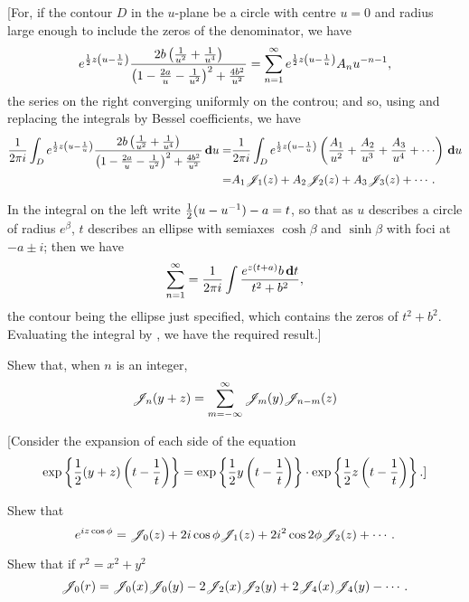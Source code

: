 \documentclass{book}
\begin{document}
[For, if the contour $D$ in the $u$-plane be a circle with centre
$u=0$ and radius large enough to include the zeros of the denominator,
we have
$$
e^{\frac{1}{2} z \left( u - \frac{1}{u} \right)} 
\frac{ 2b \left( \frac{1}{u^2} + \frac{1}{u^4}  \right)  }{ \left( 1 -
    \frac{2a}{u} - \frac{1}{u^2} \right)^2
  + \frac{4 b^2}{u^2}  }
=
\sum_{n=1}^{\infty}
e^{\frac{1}{2} z \left( u - \frac{1}{u} \right)} A_n u^{-n-1},
$$
the series on the right converging uniformly on the controu; and so, 
using  and replacing the integrals by Bessel
coefficients, we have
\begin{align*}
  \frac{1}{2\pi i}
  \int_D
  e^{\half z \theparen{u - \frac{1}{u}}}
  \frac{ 2b \theparen{\frac{1}{u^2} + \frac{1}{u^4} }  }{ \theparen{1 -
      \frac{2a}{u} - \frac{1}{u^2}}^2
    + \frac{4 b^2}{u^2}  }
  \dmeasure u
  =& \frac{1}{2\pi i}
  \int_D
  e^{\half z \theparen{u - \frac{1}{u}}}
  \theparen{ \frac{A_1}{u^2} + \frac{A_2}{u^3} + \frac{A_3}{u^4} +
    \cdots  }
  \dmeasure u \\
  =& A_1 \besJ_1(z) + A_2 \besJ_2(z) + A_3 \besJ_3(z) + \cdots .
\end{align*}

% 
% 
In the integral on the left write $\frac{1}{2} (u - u^{-1}) - a = t$, so that as
$u$ describes a circle of radius $e^{\beta}$, $t$ describes an ellipse
with 
semiaxes $\cosh\beta$ and $\sinh\beta$ with foci at 
$-a \pm i$; then we have
$$
\sum_{n=1}^{\infty}
=
\frac{1}{2\pi i}
\int
\frac{ e^{z(t+a)}b \, \mathbf{d} t  }{ t^2 + b^2  },
$$
the contour being the ellipse just specified, which contains the zeros
of $t^2 + b^2$. Evaluating the integral by 
, we have the required result.]
\begin{wandwexample}
  Shew that, when $n$ is an integer,
  $$
  \mathscr{J}_n(y+z)
  =
  \sum_{m = -\infty}^{\infty} \mathscr{J}_{m}(y) \mathscr{J}_{n-m}(z)
  $$
\end{wandwexample}
[Consider the expansion of each side of the equation
$$
\exp \left\{  \frac{1}{2} (y+z) \left( t - \frac{1}{t} \right)   \right\}
=
\exp \left\{  \frac{1}{2} y \left( t - \frac{1}{t} \right)   \right\}
\cdot
\exp \left\{  \frac{1}{2} z \left( t - \frac{1}{t} \right)   \right\}.]
$$
\begin{wandwexample}
  Shew that 
  $$
  e^{i z \cos \phi}
  = 
  \mathscr{J}_0(z)
  + 2 i \cos\phi \mathscr{J}_1(z)
  + 2 i^2 \cos 2\phi \mathscr{J}_2(z)
  + \cdots.
  $$
\end{wandwexample}
\begin{wandwexample}
  Shew that if $r^2 = x^2 + y^2$
  $$
  \mathscr{J}_0(r)
  =
  \mathscr{J}_0(x)\mathscr{J}_0(y)
  - 2 \mathscr{J}_2(x) \mathscr{J}_2(y)
  + 2 \mathscr{J}_4(x) \mathscr{J}_4(y)
  - \cdots .
  $$
\end{wandwexample}
\end{document}
